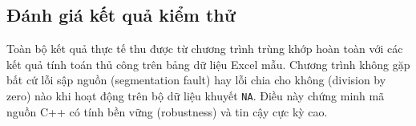\subsection{Đánh giá kết quả kiểm thử}
Toàn bộ kết quả thực tế thu được từ chương trình trùng khớp hoàn toàn với các kết quả tính toán thủ công trên bảng dữ liệu Excel mẫu. Chương trình không gặp bất cứ lỗi sập nguồn (segmentation fault) hay lỗi chia cho không (division by zero) nào khi hoạt động trên bộ dữ liệu khuyết \texttt{NA}. Điều này chứng minh mã nguồn C++ có tính bền vững (robustness) và tin cậy cực kỳ cao.

